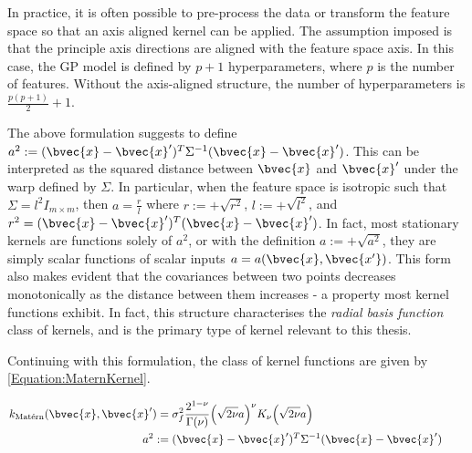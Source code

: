 				In practice, it is often possible to pre-process the data or transform the feature space so that an axis aligned kernel can be applied. The assumption imposed is that the principle axis directions are aligned with the feature space axis. In this case, the GP model is defined by $p + 1$ hyperparameters, where $p$ is the number of features. Without the axis-aligned structure, the number of hyperparameters is $\frac{p(p + 1)}{2} + 1$.
				
				The above formulation suggests to define $a^{2} := (\bvec{x} - \bvec{x}')^{T} \Sigma^{-1} (\bvec{x} - \bvec{x}')$. This can be interpreted as the squared distance between $\bvec{x}$ and $\bvec{x}'$ under the warp defined by $\Sigma$. In particular, when the feature space is isotropic such that $\Sigma = l^{2} I_{m \times m}$, then $a = \frac{r}{l}$ where $r := +\sqrt{r^{2}}$, $l := +\sqrt{l^{2}}$, and $r^{2} = (\bvec{x} - \bvec{x}')^{T} (\bvec{x} - \bvec{x}')$. In fact, most stationary kernels are functions solely of $a^{2}$, or with the definition $a := +\sqrt{a^{2}}$, they are simply scalar functions of scalar inputs $a = a (\bvec{x}, \bvec{x'})$. This form also makes evident that the covariances between two points decreases monotonically as the distance between them increases - a property most kernel functions exhibit. In fact, this structure characterises the \textit{radial basis function} class of kernels, and is the primary type of kernel relevant to this thesis.
				
				Continuing with this formulation, the \matern class of kernel functions are given by \eqref{Equation:MaternKernel}.
				
				\begin{equation}
					\left.
						\begin{aligned}
							k_{\mathrm{\maternmath}}(\bvec{x}, \bvec{x}') =& \; \sigma_{f}^{2} \frac{2^{1 - \nu}}{\Gamma(\nu)} \Big( \sqrt{2 \nu} a \Big)^{\nu} K_{\nu}\Big( \sqrt{2 \nu} a \Big) \\
							a^{2} :=& \; (\bvec{x} - \bvec{x}')^{T} \Sigma^{-1} (\bvec{x} - \bvec{x}')
						\end{aligned}
					\qquad \right.
				\label{Equation:MaternKernel}
				\end{equation}
							
